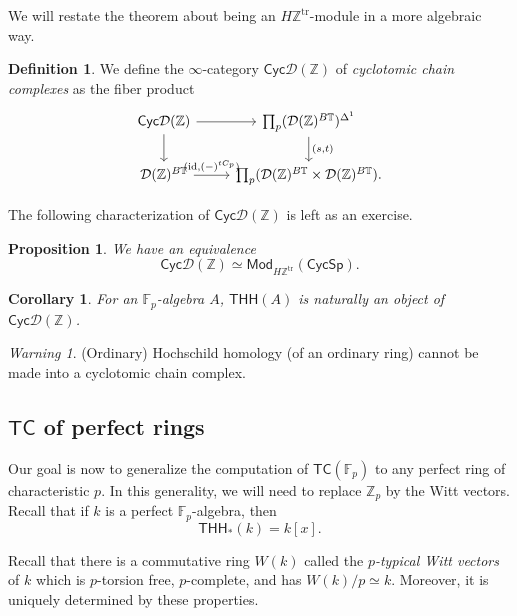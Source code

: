 \documentclass[10pt, oneside]{memoir}
\newtheorem{cor}[thm]{Corollary}
\newtheorem{prop}[thm]{Proposition}
\theoremstyle{definition}
\newtheorem{defn}[thm]{Definition}
\theoremstyle{remark}
\newtheorem{warn}[thm]{Warning}
\theoremstyle{plain}
\theoremstyle{definition}
\theoremstyle{remark}
\newcommand{\Z}{\mathbb{Z}}
\newcommand{\F}{\mathbb{F}}
\newcommand{\mc}[1]{\mathcal{#1}}
\newcommand{\T}{\mathbb{T}}
\newcommand{\mr}[1]{\mathrm{#1}}
\newcommand{\ms}[1]{\mathsf{#1}}
\newcommand{\1}{\mathbf{1}}
\newcommand{\2}{\mathbf{2}}
\newcommand{\3}{\mathbf{3}}
\newcommand{\THH}{\ms{THH}}
\newcommand{\TC}{\ms{TC}}
\begin{document}
We will restate the theorem about being an \(H\Z^{\mr{tr}} \)-module in a more algebraic way.

\begin{defn}
    We define the \(\infty \)-category \(\ms{Cyc}\mc{D}(\Z) \) of \textit{cyclotomic chain complexes} as the fiber product
    \begin{equation*}
    \begin{tikzcd}
        \ms{Cyc}\mc{D}(\Z) \ar{r} \ar{d} & \prod_p (\mc{D}(\Z)^{B\T})^{\Delta^1} \ar{d}{(s, t)} \\
        \mc{D}(\Z)^{B\T} \ar{r}{(\mr{id}, (-)^{tC_p})} & \prod_p (\mc{D}(\Z)^{B\T} \times \mc{D}(\Z)^{B\T}).
    \end{tikzcd}
    \end{equation*}
\end{defn}

The following characterization of \(\ms{Cyc}\mc{D}(\Z) \) is left as an exercise.
\begin{prop}
    We have an equivalence
    \[ \ms{Cyc}\mc{D}(\Z) \simeq \ms{Mod}_{H\Z^{\mr{tr}}} (\ms{CycSp}). \]
\end{prop}

\begin{cor}
    For an \(\F_p \)-algebra \(A \), \(\THH(A) \) is naturally an object of \(\ms{Cyc}\mc{D}(\Z) \).
\end{cor}

\begin{warn}
    (Ordinary) Hochschild homology (of an ordinary ring) cannot be made into a cyclotomic chain complex.
\end{warn}



\subsection{\(\TC \) of perfect rings}%
\label{sub:TC of perfect rings}

Our goal is now to generalize the computation of \(\TC(\F_p) \) to any perfect ring of characteristic \(p \). In this generality, we will need to replace \(\Z_p \) by the Witt vectors. Recall that if \(k \) is a perfect \(\F_p \)-algebra, then
\[ \THH_*(k) = k[x]. \]

Recall that there is a commutative ring \(W(k) \) called the \textit{\(p \)-typical Witt vectors} of \(k \) which is \(p \)-torsion free, \(p \)-complete, and has \(W(k)/p \simeq k \). Moreover, it is uniquely determined by these properties.
\end{document}
